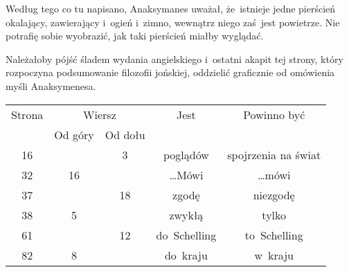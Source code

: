 \documentclass[a4paper,11pt]{article}
\begin{document}
\noindent
{} Według tego co tu napisano, Anaksymanes uważał,
że~istnieje jedne pierścień okalający, zawierający i~ogień i~zimno,
wewnątrz niego zaś~jest powietrze. Nie potrafię sobie wyobrazić, jak
taki pierścień miałby wyglądać.

\vspace{\spaceFour}





\noindent
{} Należałoby pójść śladem wydania angielskiego i~ostatni
akapit tej strony, który rozpoczyna podsumowanie filozofii jońskiej,
oddzielić graficznie od omówienia myśli Anaksymenesa.





\newpage



\begin{center}

  \begin{tabular}{|c|c|c|c|c|}
    \hline
    Strona & \multicolumn{2}{c|}{Wiersz} & Jest
                              & Powinno być \\ \cline{2-3}
    & Od góry & Od dołu & & \\
    \hline
    16  & &  3 & poglądów & spojrzenia na świat \\
    32  & 16 & & \ldots Mówi & \ldots mówi \\
    37  & & 18 & zgodę & niezgodę \\
    38  &  5 & & zwykłą & tylko \\
    61 & & 12 & do~Schelling & to~Schelling \\
    82 &  8 & & do~kraju & w~kraju \\
    \hline
  \end{tabular}

\end{center}

\vspace{\spaceTwo}
\end{document}
